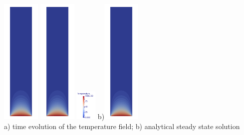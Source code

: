 \begin{center}
\includegraphics[width=1.8cm]{images/benchmark_lapplate/temper0040.png}
\includegraphics[width=1.8cm]{images/benchmark_lapplate/temper0050.png}
\includegraphics[width=1cm]{images/benchmark_lapplate/colourscale.png}
\hspace{.2cm}
b)\includegraphics[width=1.8cm]{images/benchmark_lapplate/temper_analytical.png}\\
{\captionfont a) time evolution of the temperature field; b) analytical steady state solution}
\end{center}




